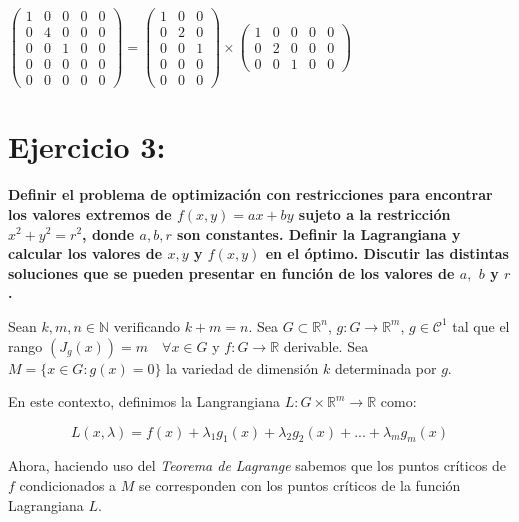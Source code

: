 \documentclass{article}
\begin{document}
\begin{itemize}
		\begin{center}
			$
			\left(\begin{matrix}
			1 & 0 & 0 & 0 & 0\\
			0 & 4 & 0 & 0 & 0\\
			0 & 0 & 1 & 0 & 0\\
			0 & 0 & 0 & 0 & 0\\
			0 & 0 & 0 & 0 & 0
			\end{matrix}\right)
			=
			\left(\begin{matrix}
			1 & 0 & 0\\
			0 & 2 & 0\\
			0 & 0 & 1\\
			0 & 0 & 0\\
			0 & 0 & 0
			\end{matrix}\right)
			\times
			\left(\begin{matrix}
			1 & 0 & 0 & 0 & 0\\
			0 & 2 & 0 & 0 & 0\\
			0 & 0 & 1 & 0 & 0
			\end{matrix}\right)
			$
	 \end{center}
	\end{itemize}	
	
		
\newpage
	
\section{Ejercicio 3:}
\textbf{Definir el problema de optimización con restricciones para encontrar los valores extremos de $f(x,y)=ax+by$ sujeto a la restricción $x^2+y^2 =r^2$, donde $a,b,r$ son constantes. Definir la Lagrangiana y calcular los valores de $x,y$ y $f(x,y)$ en el óptimo. Discutir las distintas soluciones que se pueden presentar en función de los valores de $a,$  $b$ y $r$.}
	
	Sean $k,m,n \in \mathbb{N}$ verificando $k+m = n$. Sea $G \subset \mathbb{R}^n$,  $g:G \to \mathbb{R}^m$,   $g \in \mathcal{C}^1$ tal que el rango $(J_g(x)) = m \quad \forall x \in G$ y $f:G \to \mathbb{R}$ derivable. Sea $M = \{x \in G : g(x) = 0 \}$  la variedad de dimensión $k$ determinada por $g$.
	
	En este contexto, definimos la Langrangiana $L: G \times \mathbb{R}^m \to \mathbb{R}$ como:
	
	\[
		L(x, \lambda) = f(x) + \lambda_1 g_1(x) + \lambda_2 g_2(x) + ... + \lambda_m g_m(x)
	\]
	
	Ahora, haciendo uso del \textit{Teorema de Lagrange} sabemos que los puntos críticos de $f$ condicionados a $M$ se corresponden con los puntos críticos de la función Lagrangiana $L$.
	
\end{document}
